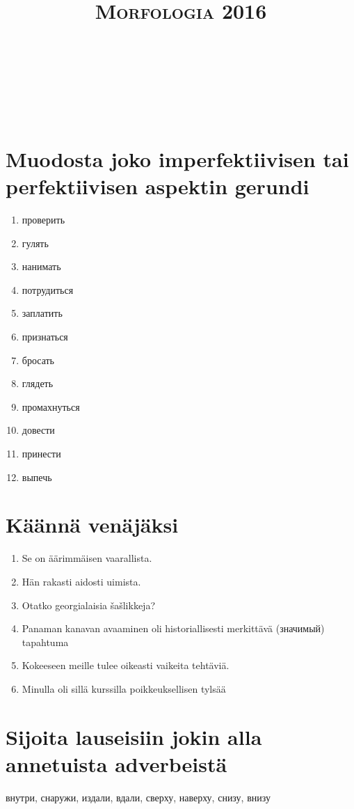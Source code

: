 \documentclass[paper=a4, fontsize=11pt]{scrartcl}
\title{	
\normalfont \normalsize 
\textsc{Morfologia 2016} \\ [25pt] %
\horrule{0.5pt} \\[0.4cm] %
\huge  \\ %
\horrule{2pt} \\[0.5cm] %
}
\date{} %
\begin{document}
\section{Muodosta joko imperfektiivisen tai perfektiivisen aspektin gerundi}

\begin{enumerate}
    \item  проверить
    \item  гулять
    \item  нанимать
    \item  потрудиться
    \item  заплатить
    \item  признаться
    \item  бросать
    \item  глядеть
    \item  промахнуться
    \item  довести
    \item  принести
    \item  выпечь
\end{enumerate}


\section{Käännä venäjäksi}

\begin{enumerate}

    \item Se on äärimmäisen vaarallista.
    \item Hän rakasti aidosti uimista.
    \item Otatko georgialaisia šašlikkeja?
    \item Panaman kanavan avaaminen oli historiallisesti merkittävä (значимый) tapahtuma
    \item Kokeeseen meille tulee oikeasti vaikeita tehtäviä.
    \item Minulla oli sillä kurssilla poikkeuksellisen tylsää

\end{enumerate}

\section{Sijoita lauseisiin jokin alla annetuista adverbeistä}

внутри, снаружи, издали, вдали, сверху, наверху, снизу, внизу
\end{document}
